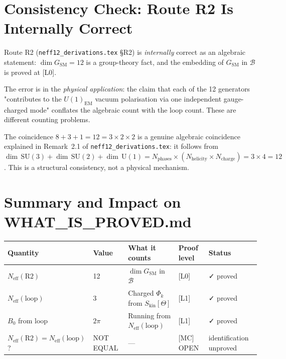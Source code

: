\documentclass[12pt,a4paper]{article}
\theoremstyle{remark}
\newcommand{\Neff}{N_{\mathrm{eff}}}
\begin{document}
\section{Consistency Check: Route R2 Is Internally Correct}
\label{sec:R2_correct}

Route R2 (\texttt{neff12\_derivations.tex} §R2) is \emph{internally} correct
as an algebraic statement: $\dim G_{\mathrm{SM}} = 12$ is a group-theory fact,
and the embedding of $G_{\mathrm{SM}}$ in $\mathcal{B}$ is proved at [L0].

The error is in the \emph{physical application}: the claim that each of the
12 generators "contributes to the $U(1)_{\mathrm{EM}}$ vacuum polarisation via
one independent gauge-charged mode" conflates the algebraic count with the
loop count.  These are different counting problems.

The coincidence $8 + 3 + 1 = 12 = 3\times 2\times 2$ is a genuine algebraic
coincidence explained in Remark~2.1 of \texttt{neff12\_derivations.tex}:
it follows from $\dim\,\mathrm{SU}(3) + \dim\,\mathrm{SU}(2) + \dim\,\mathrm{U}(1)
= N_{\mathrm{phases}}\times(N_{\mathrm{helicity}}\times N_{\mathrm{charge}})
= 3\times 4 = 12$.
This is a structural consistency, not a physical mechanism.

\section{Summary and Impact on WHAT\_IS\_PROVED.md}
\label{sec:summary}

\begin{center}
\begin{tabular}{lllll}
\toprule
Quantity & Value & What it counts & Proof level & Status \\
\midrule
$\Neff(\mathrm{R2})$ & 12 & $\dim G_{\mathrm{SM}}$ in $\mathcal{B}$ & [L0] & ✓ proved \\
$\Neff(\mathrm{loop})$ & 3 & Charged $\Phi_k$ from $S_{\mathrm{kin}}[\Theta]$ & [L1] & ✓ proved \\
$B_0$ from loop & $2\pi$ & Running from $\Neff(\mathrm{loop})$ & [L1] & ✓ proved \\
$\Neff(\mathrm{R2}) = \Neff(\mathrm{loop})$? & NOT EQUAL & — & [MC] OPEN & 
  identification unproved \\
\bottomrule
\end{tabular}
\end{center}
\end{document}
